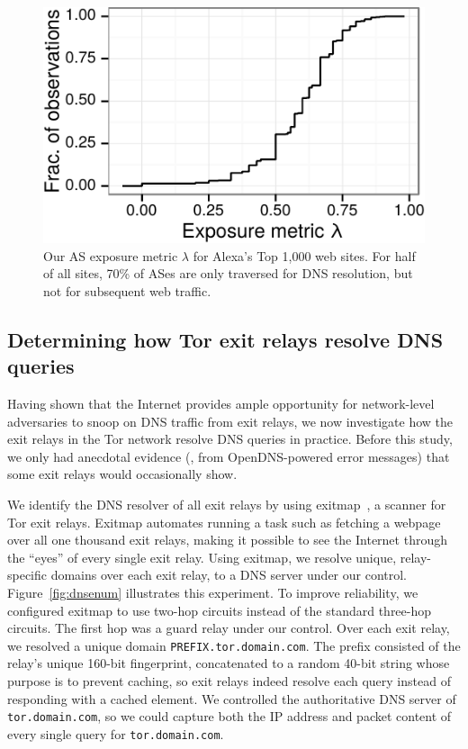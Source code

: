 
\begin{figure}[t]
	\centering
	\includegraphics[width=0.75\linewidth]{figures/dns-exposure.pdf}
	\caption{Our AS exposure metric $\lambda$ for Alexa's Top 1,000 web sites.
	For half of all sites, 70\% of ASes are only traversed for DNS resolution,
	but not for subsequent web traffic.}
	\label{fig:exposure}
\end{figure}

\subsection{Determining how Tor exit relays resolve DNS queries}
\label{sec:mapping-resolvers}

Having shown that the Internet provides ample opportunity for
network-level adversaries to snoop on DNS traffic from exit relays, we
now investigate how the exit relays in the Tor network resolve DNS
queries in practice. Before this study,
we only had anecdotal evidence (\eg, from OpenDNS-powered error messages)
that some exit relays would occasionally show.

We identify the DNS resolver of all exit relays by using
exitmap~\cite{exitmap}, a scanner for Tor exit relays.  Exitmap automates
running a task such as fetching a webpage over all one thousand exit relays,
making it possible to see the Internet through the ``eyes'' of every single
exit relay.  Using exitmap, we resolve unique, relay-specific domains over
each exit relay, to a DNS server under our control.
Figure~\ref{fig:dnsenum} illustrates this experiment.  To improve reliability, we configured
exitmap to use two-hop circuits instead of the standard three-hop circuits.
The first hop was a guard relay under our control.  Over each exit relay, we
resolved a unique domain {\tt PREFIX.tor.domain.com}.  The prefix consisted of the
relay's unique 160-bit fingerprint, concatenated to a random 40-bit string
whose purpose is to prevent caching, so exit relays indeed resolve each query
instead of responding with a cached element.  We controlled the authoritative
DNS server of {\tt tor.domain.com}, so we could capture both the IP address and packet
content of every single query for {\tt tor.domain.com}.

